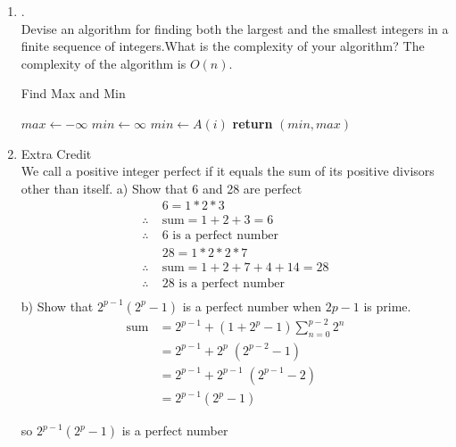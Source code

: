 \documentclass{article}
\theoremstyle{definition}
\theoremstyle{plain}
\begin{document}
\begin {enumerate}[itemindent=30pt,label=\bf Exercise {\arabic*}:]
\item .\\Devise an algorithm for finding both the largest and the smallest integers in a finite sequence of integers.What is the complexity of your algorithm?
\subitem The complexity of the algorithm is $O(n)$.
\begin{algorithm}[h]
\caption{Find Max and Min}
\begin{algorithmic}[1]
 
   \State $max \leftarrow -\infty$ 
   \State $min \leftarrow \infty$ 
    
			\State $min \gets A(i)$	
		\EndIf
			 
		\EndIf
   \EndFor
   \State \textbf{return} $(min, max)$
\EndProcedure
\end{algorithmic}
\end{algorithm}
\newpage
\item Extra Credit\\We call a positive integer perfect if it equals the sum of its positive divisors other than itself.
\subitem a) Show that 6 and 28 are perfect
\begin{align*}
	&6 = 1*2*3	\\
	\therefore\; &\text{sum} = 1+2+3 = 6\\
	\therefore\; &\text{6 is a perfect number}\\ 
	&28 = 1*2*2*7 \\
	\therefore\; &\text{sum} = 1+2+7 + 4 + 14  = 28\\
	\therefore\; &\text{28 is a perfect number}\\
\end{align*} 
\subitem b) Show that $2^{p-1}(2^{p}-1)$ is a perfect number when $2p-1$ is prime.
\begin{align*}
	\text{sum} &= 2^{p-1} + (1 + 2^p -1)\sum \limits_{n = 0}^{p-2} 2^{n}\\
			   &= 2^{p-1} +  2^p\;(2^{p-2}-1) \\
			   &= 2^{p-1} +  2^{p-1}\;(2^{p-1}-2) \\
			   &= 2^{p-1}(2^{p}-1)
\end{align*}
\begin{center}
	so $2^{p-1}(2^{p}-1)$ is a perfect number
\end{center}
\end{enumerate}
\end{document}
